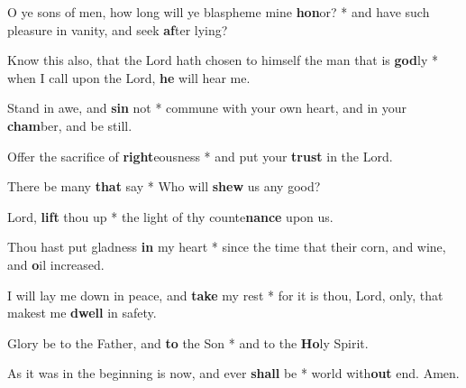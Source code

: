 \begin{multicols}{2}
	O ye sons of men, how long will ye blaspheme mine \textbf{hon}or? * and have such pleasure in vanity, and seek \textbf{af}ter lying?
	
	Know this also, that the Lord hath chosen to himself the man that is \textbf{god}ly * when I call upon the Lord, \textbf{he} will hear me.
	
	Stand in awe, and \textbf{sin} not * commune with your own heart, and in your \textbf{cham}ber, and be still.
	
	Offer the sacrifice of \textbf{right}eousness * and put your \textbf{trust} in the Lord.
	
	There be many \textbf{that} say * Who will \textbf{shew} us any good?
	
	Lord, \textbf{lift} thou up * the light of thy counte\textbf{nance} upon us.
	
	Thou hast put gladness \textbf{in} my heart * since the time that their corn, and wine, and \textbf{o}il increased.
	
	I will lay me down in peace, and \textbf{take} my rest * for it is thou, Lord, only, that makest me \textbf{dwell} in safety.
	
	Glory be to the Father, and \textbf{to} the Son * and to the \textbf{Ho}ly Spirit.
	
	As it was in the beginning is now, and ever \textbf{shall} be * world with\textbf{out} end. Amen.
\end{multicols}